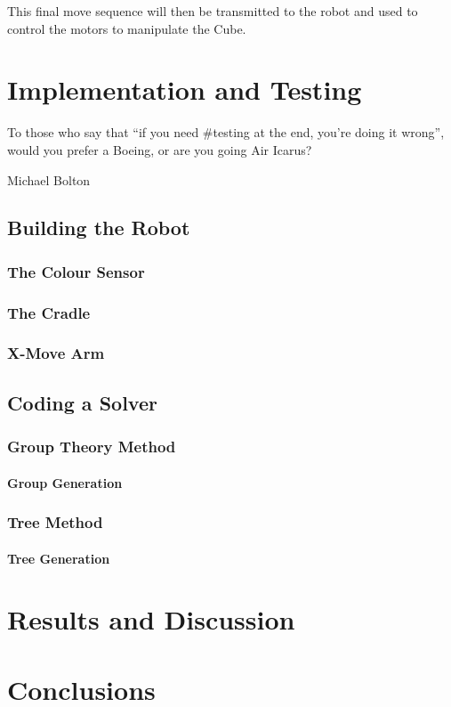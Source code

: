 \documentclass{report}
\begin{document}
    
    This final move sequence will then be transmitted to the robot and used to control the motors to manipulate the Cube. %
    
    \newpage
    \chapter{Implementation and Testing}
    \epigraph{To those who say that \enquote{if you need \#testing at the end, you're doing it wrong}, would you prefer a Boeing, or are you going Air Icarus?}{Michael Bolton \cite{Bolton2016}}
    \section{Building the Robot}
    
    
    
    \subsection{The Colour Sensor}
    \subsection{The Cradle}
    \subsection{X-Move Arm}
    \section{Coding a Solver}
    \subsection{Group Theory Method}
    \subsubsection{Group Generation}
    \subsection{Tree Method}
    \subsubsection{Tree Generation}
    
    \newpage
    \chapter{Results and Discussion}
    
    \newpage
    \chapter{Conclusions}
    
    \begin{appendix}
    	\newpage  
    	\listoffigures
    	\listoftables
    	\newpage
    	
    	
    \end{appendix}
    
\end{document}
